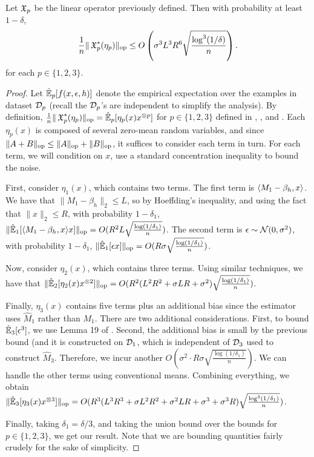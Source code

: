 \begin{lemma}
\label{lem:lowRankUpper}
Let $\operatorname{\mathfrak{X}}_p$ be the linear operator previously defined. Then with probability at least $1-\delta$,
$$\frac1{n} \|\operatorname{\mathfrak{X}}_p^*(\eta_p)\|_{\text{\rm op}} \le O\left(\sigma^3 L^3 R^6 \sqrt{\frac{\log^3(1/\delta)}{n}}\right).$$
for each $p \in \{1,2,3\}$.
\end{lemma}
\begin{proof}
Let $\hat{\operatorname{\mathbb{E}}}_p[f(x,\epsilon,h)]$ denote the empirical expectation over the examples in dataset $\mathcal{D}_p$
(recall the $\mathcal{D}_p$'s are independent to simplify the analysis).
By definition,
$\frac1n \|\operatorname{\mathfrak{X}}_p^*(\eta_p)\|_{\text{\rm op}} = \hat{\operatorname{\mathbb{E}}}_p[\eta_p(x) x^{\otimes p}]$
for $p \in \{1,2,3\}$ defined in , , and .
Each $\eta_p(x)$ is composed of several zero-mean random variables,
and since $\|A + B\|_{\text{\rm op}} \le \|A\|_{\text{\rm op}} + \|B\|_{\text{\rm op}}$,
it suffices to consider each term in turn.
For each term, we will condition on $x$, use a standard concentration inequality to
bound the noise.

First, consider $\eta_1(x)$, which contains two terms.
The first term is $\langle M_1 - \beta_h, x \rangle$.
We have that $\|M_1 - \beta_h\|_2 \le L$,
so by Hoeffding's inequality, and using the fact that $\|x\|_2 \le R$,
with probability $1-\delta_1$,
$\|\hat{\operatorname{\mathbb{E}}}_1[\langle M_1 - \beta_h, x \rangle x]\|_{\text{\rm op}} = O(R^2 L \sqrt{\frac{\log(1/\delta_1)}{n}})$.
The second term is $\epsilon \sim \mathcal{N}(0, \sigma^2)$,
with probability $1-\delta_1$,
$\|\hat{\operatorname{\mathbb{E}}}_1[\epsilon x]\|_{\text{\rm op}} = O(R \sigma \sqrt{\frac{\log(1/\delta_1)}{n}})$.

Now, consider $\eta_2(x)$, which contains three terms.
Using similar techniques, we have that
$\|\hat{\operatorname{\mathbb{E}}}_2[\eta_2(x) x^{\otimes 2}]\|_{\text{\rm op}} = O(R^2 (L^2 R^2 + \sigma L R + \sigma^2) \sqrt{\frac{\log(1/\delta_1)}{n}})$.

Finally, $\eta_3(x)$ contains five terms plus an additional bias since the estimator uses $\hat M_1$ rather than $M_1$.
There are two additional considerations.
First, to bound $\hat{\operatorname{\mathbb{E}}}_3[\epsilon^3]$, we use Lemma 19 of \cite{hsu13spherical}.
Second, the additional bias is small by the previous bound (and it is constructed on $\mathcal{D}_1$, which is independent of $\mathcal{D}_3$
used to construct $\hat M_3$.
Therefore, we incur another $O(\sigma^2 \cdot R \sigma \sqrt{\frac{\log(1/\delta_1)}{n}})$.
We can handle the other terms using conventional means.
Combining everything, we obtain
$\|\hat{\operatorname{\mathbb{E}}}_3[\eta_3(x) x^{\otimes 3}]\|_{\text{\rm op}} = O(R^3 (L^3 R^3 + \sigma L^2 R^2 + \sigma^2 L R + \sigma^3 + \sigma^3 R) \sqrt{\frac{\log^3(1/\delta_1)}{n}})$.

Finally, taking $\delta_1 = \delta/3$, and taking the union bound over the bounds for $p \in \{1,2,3\}$,
we get our result.
Note that we are bounding quantities fairly crudely for the sake of simplicity.
\end{proof}

